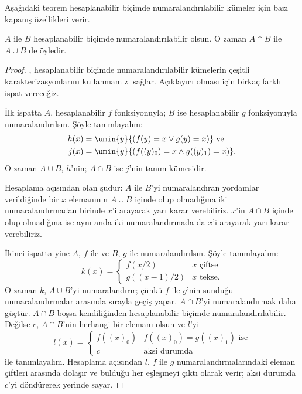 



Aşağıdaki teorem hesaplanabilir biçimde numaralandırılabilir kümeler için
bazı kapanış özellikleri verir.

\begin{thm}
$A$ ile $B$ hesaplanabilir biçimde numaralandırılabilir olsun. O zaman
$A\cap B$ ile $A\cup B$ de öyledir.
\end{thm}

\begin{proof}
, hesaplanabilir biçimde numaralandırılabilir
kümelerin çeşitli karakterizasyonlarını kullanmamızı sağlar. Açıklayıcı
olması için birkaç farklı ispat vereceğiz.

İlk ispatta $A$, hesaplanabilir $f$ fonksiyonuyla; $B$ ise hesaplanabilir
$g$ fonksiyonuyla numaralandırılsın. Şöyle tanımlayalım:
\begin{align*}
  h(x) & = \umin{y}{(f(y)=x\lor g(y)=x)} \text{ ve}\\
  j(x) & = \umin{y}{(f((y)_0)=x\land g((y)_1)=x)}.
\end{align*}
O zaman $A\cup B$, $h$'nin; $A\cap B$ ise $j$'nin tanım kümesidir.

\begin{explain}
Hesaplama açısından olan şudur: $A$ ile $B$'yi numaralandıran yordamlar
verildiğinde bir $x$ elemanının $A\cup B$ içinde olup olmadığına iki
numaralandırmadan birinde $x$'i arayarak yarı karar verebiliriz. $x$'in
$A\cap B$ içinde olup olmadığına ise aynı anda iki numaralandırmada da
$x$'i arayarak yarı karar verebiliriz.
\end{explain}

İkinci ispatta yine $A$, $f$ ile ve $B$, $g$ ile numaralandırılsın. Şöyle
tanımlayalım:
\[
  k(x)=\begin{cases}
    f(x/2) & \text{$x$ çiftse}\\
    g((x-1)/2) & \text{$x$ tekse.}
  \end{cases}
\]
O zaman $k$, $A\cup B$'yi numaralandırır; çünkü $f$ ile $g$'nin sunduğu
numaralandırmalar arasında sırayla geçiş yapar. $A\cap B$'yi numaralandırmak
daha güçtür. $A\cap B$ boşsa kendiliğinden hesaplanabilir biçimde
numaralandırılabilir. Değilse $c$, $A\cap B$'nin herhangi bir elemanı olsun
ve $l$'yi
\[
  l(x)=\begin{cases}
    f((x)_0) & \text{$f((x)_0)=g((x)_1)$ ise}\\
    c & \text{aksi durumda}
  \end{cases}
\]
ile tanımlayalım. Hesaplama açısından $l$, $f$ ile $g$ numaralandırmalarındaki
eleman çiftleri arasında dolaşır ve bulduğu her eşleşmeyi çıktı olarak verir;
aksi durumda $c$'yi döndürerek yerinde sayar.


\end{proof}
